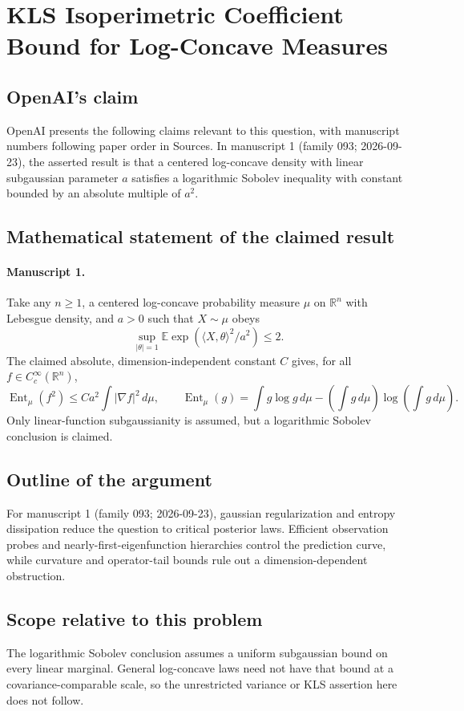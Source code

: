 \documentclass[11pt]{article}
\begin{document}
\section*{KLS Isoperimetric Coefficient Bound for Log-Concave Measures}

\subsection{OpenAI's claim}
OpenAI presents the following claims relevant to this question, with manuscript numbers following paper order in Sources. In manuscript 1 (family 093; 2026-09-23), the asserted result is that a centered log-concave density with linear subgaussian parameter $a$ satisfies a logarithmic Sobolev inequality with constant bounded by an absolute multiple of $a^2$.

\subsection{Mathematical statement of the claimed result}
\paragraph{Manuscript 1.}
Take any $n\ge1$, a centered log-concave probability measure $\mu$ on $\mathbb R^n$ with Lebesgue density, and $a>0$ such that $X\sim\mu$ obeys
\[
 \sup_{|\theta|=1}\mathbb E\exp(\langle X,\theta\rangle^2/a^2)\le2.
\]
The claimed absolute, dimension-independent constant $C$ gives, for all $f\in C_c^{\infty}(\mathbb R^n)$,
\[
 \operatorname{Ent}_{\mu}(f^2)\le Ca^2\int|\nabla f|^2\,d\mu,
 \qquad \operatorname{Ent}_{\mu}(g)=\int g\log g\,d\mu-
 (\int g\,d\mu)\log(\int g\,d\mu).
\]
Only linear-function subgaussianity is assumed, but a logarithmic Sobolev conclusion is claimed.

\subsection{Outline of the argument}
For manuscript 1 (family 093; 2026-09-23), gaussian regularization and entropy dissipation reduce the question to critical posterior laws. Efficient observation probes and nearly-first-eigenfunction hierarchies control the prediction curve, while curvature and operator-tail bounds rule out a dimension-dependent obstruction.

\subsection{Scope relative to this problem}
The logarithmic Sobolev conclusion assumes a uniform subgaussian bound on every linear marginal. General log-concave laws need not have that bound at a covariance-comparable scale, so the unrestricted variance or KLS assertion here does not follow.
\end{document}
